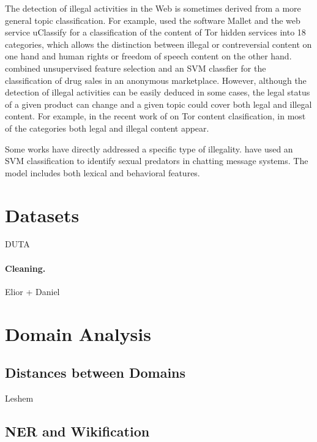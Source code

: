 \documentclass[11pt,a4paper]{article}
\begin{document}
The detection of illegal activities in the Web is sometimes derived from a more general topic classification. For example, \citet{Biryukov14} used the software Mallet \citep{McCallum02} and the web service uClassify \citep{Kagstrom13} for a classification of the content of Tor hidden services into 18 categories, which allows the distinction between illegal or contreversial content on one hand and human rights or freedom of speech content on the other hand. \citet{GraczykKinningham15} combined unsupervised feature selection and an SVM classfier for the classification of drug sales in an anonymous marketplace. However, although the detection of illegal activities can be easily deduced in some cases, the legal status of a given product can change \citep{GraczykKinningham15} and a given topic could cover both legal and illegal content. For example, in the recent work of \citet{Avarikioti18} on Tor content clasification, in most of the categories both legal and illegal content appear.

Some works have directly addressed a specific type of illegality. \citet{MorrisHirst12} have used an SVM classification to identify sexual predators in chatting message systems. The model includes both lexical and behavioral features.





\section{Datasets}

DUTA \citep{AlNabki17}

\paragraph{Cleaning.} Elior + Daniel

\section{Domain Analysis}

\subsection{Distances between Domains}

Leshem



\subsection{NER and Wikification}
\end{document}
